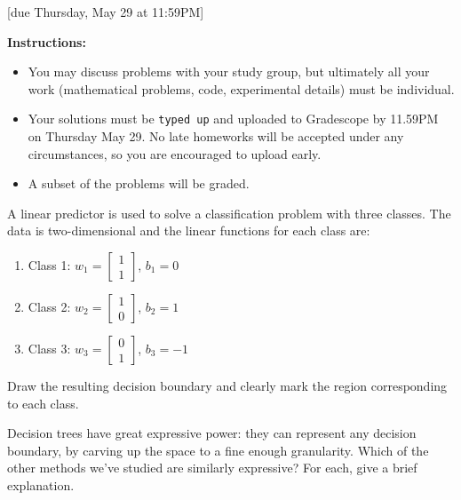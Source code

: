 \documentclass{article}
\begin{document}
[due Thursday, May 29 at 11:59PM]

\textbf{Instructions:}
\begin{itemize}
    \item You may discuss problems with your study group, but ultimately all your work (mathematical problems, code, experimental details) must be individual.
    \item Your solutions must be \texttt{typed up} and uploaded to Gradescope by 11.59PM on Thursday May 29. No late homeworks will be accepted under any circumstances, so you are encouraged to upload early.
    \item A subset of the problems will be graded.
\end{itemize}

\begin{probset}
\begin{prob}
    A linear predictor is used to solve a classification problem with three classes. The data is two-dimensional and the linear functions for each class are:

    \begin{enumerate}
        \item Class 1: $w_1 = \begin{bmatrix} 1 \\ 1 \end{bmatrix}$, $b_1 = 0$
        \item Class 2: $w_2 = \begin{bmatrix} 1 \\ 0 \end{bmatrix}$, $b_2 = 1$
        \item Class 3: $w_3 = \begin{bmatrix} 0 \\ 1 \end{bmatrix}$, $b_3 = -1$
    \end{enumerate}

    Draw the resulting decision boundary and clearly mark the region corresponding to each class.

    \begin{soln}

    \end{soln}
\end{prob}

\begin{prob}
    Decision trees have great expressive power: they can represent any decision boundary, by carving up the space to a fine enough granularity. Which of the other methods we've studied are similarly expressive? For each, give a brief explanation.


\end{prob}
\end{probset}
\end{document}
